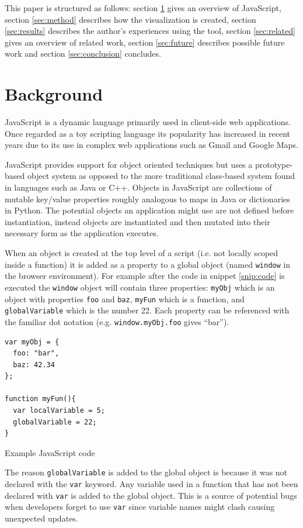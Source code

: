 \documentclass[]{article}
\begin{document}
This paper is structured as follows: section \ref{sec:background} gives an overview of JavaScript, section \ref{sec:method} describes how the visualization is created, section \ref{sec:results} describes the author's experiences using the tool, section \ref{sec:related} gives an overview of related work, section \ref{sec:future} describes possible future work and section \ref{sec:conclusion} concludes.

\section{Background}
\label{sec:background}
JavaScript \cite{ECMA-262} is a dynamic language primarily used in client-side web applications. Once regarded as a toy scripting language its popularity has increased in recent years due to its use in complex web applications such as Gmail and Google Maps.

JavaScript provides support for object oriented techniques but uses a prototype-based object system as opposed to the more traditional class-based system found in languages such as Java or C++. Objects in JavaScript are collections of mutable key/value properties roughly analogous to maps in Java or dictionaries in Python. The potential objects an application might use are not defined before instantiation, instead objects are instantiated and then mutated into their necessary form as the application executes.

When an object is created at the top level of a script (i.e. not locally scoped inside a function) it is added as a property to a global object (named {\tt window} in the browser environment). For example after the code in snippet \ref{snip:code} is executed the {\tt window} object will contain three properties: {\tt myObj} which is an object with properties {\tt foo} and {\tt baz}, {\tt myFun} which is a function, and {\tt globalVariable} which is the number 22. Each property can be referenced with the familiar dot notation (e.g. {\tt window.myObj.foo} gives ``bar'').

\begin{program}[here]
\begin{verbatim}
var myObj = {
  foo: "bar",
  baz: 42.34
};

function myFun(){
  var localVariable = 5;
  globalVariable = 22;
}
\end{verbatim}
\caption{Example JavaScript code}
\label{snip:code}
\end{program}

The reason {\tt globalVariable} is added to the global object is because it was not declared with the {\tt var} keyword. Any variable used in a function that has not been declared with {\tt var} is added to the global object. This is a source of potential bugs when developers forget to use {\tt var} since variable names might clash causing unexpected updates.
\end{document}
